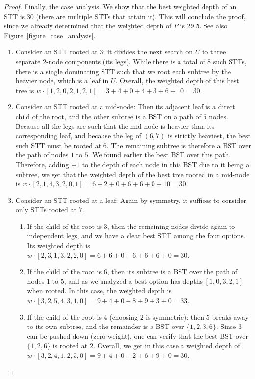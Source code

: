 \begin{proof}
Finally, the case analysis. We show that the best weighted depth of an STT is $30$ (there are multiple STTs that attain it). This will conclude the proof, since we already determined that the weighted depth of $P$ is $29.5$. See also Figure~\ref{figure_case_analysis}.

\begin{enumerate}
    \item Consider an STT rooted at $3$: it divides the next search on $U$ to three separate $2$-node components (its legs). While there is a total of $8$ such STTs, there is a single dominating STT such that we root each subtree by the heavier node, which is a leaf in $U$. Overall, the weighted depth of this best tree is $w \cdot [1,2,0,2,1,2,1] = 3+4+0+4+3+6+10=30$.

    \item Consider an STT rooted at a mid-node: Then its adjacent leaf is a direct child of the root, and the other subtree is a BST on a path of $5$ nodes. Because all the legs are such that the mid-node is heavier than its corresponding leaf, and because the leg of $(6,7)$ is strictly heaviest, the best such STT must be rooted at $6$. The remaining subtree is therefore a BST over the path of nodes $1$ to $5$. We found earlier the best BST over this path. Therefore, adding $+1$ to the depth of each node in this BST due to it being a subtree, we get that the weighted depth of the best tree rooted in a mid-node is $w \cdot [2,1,4,3,2,0,1] = 6+2 + 0+6+6 + 0+10 = 30$.

    \item Consider an STT rooted at a leaf: Again by symmetry, it suffices to  consider only STTs rooted at $7$.
    \begin{enumerate}
        \item If the child of the root is $3$, then the remaining nodes divide again to independent legs, and we have a clear best STT among the four options. Its weighted depth is $w \cdot [2,3,1,3,2,2,0] = 6+6 +0+ 6+6 + 6+0 = 30$.

        \item If the child of the root is $6$, then its subtree is a BST over the path of nodes $1$ to $5$, and as we analyzed a best option has depths $[1,0,3,2,1]$ when rooted. In this case, the weighted depth is $w \cdot [3,2,5,4,3,1,0] = 9+4+0 + 8+9 + 3+0 = 33$.

        \item If the child of the root is $4$ (choosing $2$ is symmetric): then $5$ breaks-away to its own subtree, and the remainder is a BST over $\{1,2,3,6\}$. Since $3$ can be pushed down (zero weight), one can verify that the best BST over $\{1,2,6\}$ is rooted at $2$. Overall, we get in this case a weighted depth of $w \cdot [3,2,4,1,2,3,0] = 9+4+0 + 2+6 + 9 +0 = 30$.


\end{enumerate}
\end{enumerate}
\end{proof}
